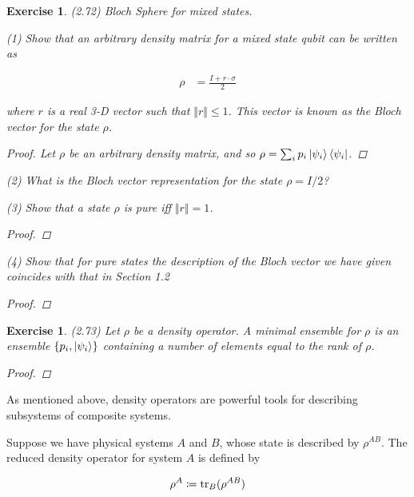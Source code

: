 \documentclass[11pt]{article}
\newcommand\0{\mathbf{0}}
\newcommand\<{\langle}
\renewcommand\>{\rangle}
\newtheorem{exercise}[theorem]{Exercise}
\begin{document}
\begin{exercise}
(2.72) Bloch Sphere for mixed states.

(1) Show that an arbitrary density matrix for a mixed state qubit can be written as

\begin{align*}
	\rho &= \frac{I + r \cdot \sigma}{2}
\end{align*}

where $r$ is a real 3-D vector such that $\Vert r \Vert \leq 1$. This vector is known as the Bloch vector for the state $\rho$. 

\begin{proof}
Let $\rho$ be an arbitrary density matrix, and so $\rho = \sum_i p_i \ket{\psi_i}\bra{\psi_i}$. 
\end{proof}	

(2) What is the Bloch vector representation for the state $\rho = I/2$?

(3) Show that a state $\rho$ is pure iff $\Vert r \Vert = 1$. 

\begin{proof}
	
\end{proof}

(4) Show that for pure states the description of the Bloch vector we have given coincides with that in Section 1.2

\begin{proof}
	
\end{proof}

\end{exercise}

\begin{exercise}
(2.73)
Let $\rho$ be a density operator. A minimal ensemble for $\rho$ is an ensemble $\{ p_i, \ket{\psi_i}\}$ containing a number of elements equal to the rank of $\rho$. 

\begin{proof}
\end{proof}	
\end{exercise}

As mentioned above, density operators are powerful tools for describing subsystems of composite systems. 
 
Suppose we have physical systems $A$ and $B$, whose state is described by $\rho^{AB}$. The reduced density operator for system $A$ is defined by

\begin{align*}
\rho^A \coloneqq \tr_B(\rho^{AB})
\end{align*}
\end{document}

